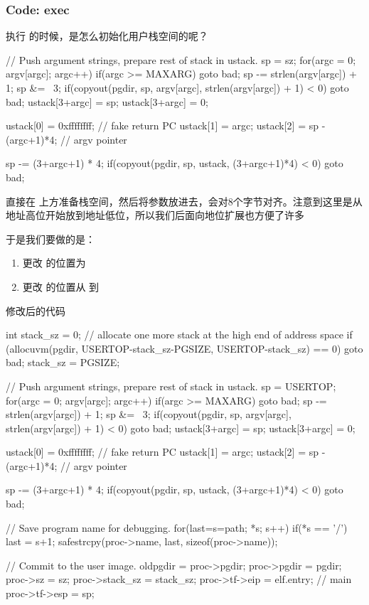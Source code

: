 \subsubsection{Code: exec}

执行  的时候，是怎么初始化用户栈空间的呢？

\begin{ccode}
    // Push argument strings, prepare rest of stack in ustack.
    sp = sz;
    for(argc = 0; argv[argc]; argc++) {
        if(argc >= MAXARG)
        goto bad;
        sp -= strlen(argv[argc]) + 1;
        sp &= ~3;
        if(copyout(pgdir, sp, argv[argc], strlen(argv[argc]) + 1) < 0)
        goto bad;
        ustack[3+argc] = sp;
    }
    ustack[3+argc] = 0;

    ustack[0] = 0xffffffff;  // fake return PC
    ustack[1] = argc;
    ustack[2] = sp - (argc+1)*4;  // argv pointer

    sp -= (3+argc+1) * 4;
    if(copyout(pgdir, sp, ustack, (3+argc+1)*4) < 0)
        goto bad;
\end{ccode}

直接在  上方准备栈空间，然后将参数放进去，会对8个字节对齐。注意到这里是从地址高位开始放到地址低位，所以我们后面向地位扩展也方便了许多

于是我们要做的是：

\begin{enumerate}
    \item 更改  的位置为 
    \item 更改  的位置从  到 
\end{enumerate}

修改后的代码

\begin{ccode}
    int stack_sz = 0;
    // allocate one more stack at the high end of address space
    if (allocuvm(pgdir, USERTOP-stack_sz-PGSIZE, USERTOP-stack_sz) == 0)
        goto bad;
    stack_sz = PGSIZE;

    // Push argument strings, prepare rest of stack in ustack.
    sp = USERTOP;
    for(argc = 0; argv[argc]; argc++) {
        if(argc >= MAXARG)
        goto bad;
        sp -= strlen(argv[argc]) + 1;
        sp &= ~3;
        if(copyout(pgdir, sp, argv[argc], strlen(argv[argc]) + 1) < 0)
        goto bad;
        ustack[3+argc] = sp;
    }
    ustack[3+argc] = 0;

    ustack[0] = 0xffffffff;  // fake return PC
    ustack[1] = argc;
    ustack[2] = sp - (argc+1)*4;  // argv pointer

    sp -= (3+argc+1) * 4;
    if(copyout(pgdir, sp, ustack, (3+argc+1)*4) < 0)
        goto bad;

    // Save program name for debugging.
    for(last=s=path; *s; s++)
        if(*s == '/')
        last = s+1;
    safestrcpy(proc->name, last, sizeof(proc->name));

    // Commit to the user image.
    oldpgdir = proc->pgdir;
    proc->pgdir = pgdir;
    proc->sz = sz;
    proc->stack_sz = stack_sz;
    proc->tf->eip = elf.entry;  // main
    proc->tf->esp = sp;
\end{ccode}

